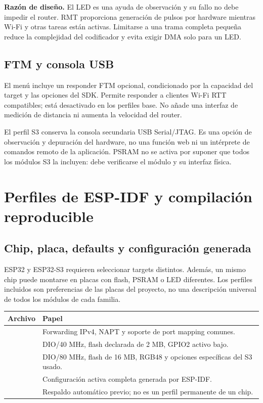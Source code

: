 \documentclass[11pt,a4paper]{article}
\newcommand{\decision}[1]{\par\textbf{Razón de diseño.} #1\par}
\begin{document}
\decision{El LED es una ayuda de observación y su fallo no debe impedir
el router. RMT proporciona generación de pulsos por hardware mientras
Wi-Fi y otras tareas están activas. Limitarse a una trama completa pequeña
reduce la complejidad del codificador y evita exigir DMA solo para un LED.}

\subsection{FTM y consola USB}

El menú incluye un responder FTM opcional, condicionado por la capacidad
del target y las opciones del SDK. Permite responder a clientes Wi-Fi RTT
compatibles; está desactivado en los perfiles base. No añade una interfaz
de medición de distancia ni aumenta la velocidad del router.

El perfil S3 conserva la consola secundaria USB Serial/JTAG. Es una
opción de observación y depuración del hardware, no una función web ni
un intérprete de comandos remoto de la aplicación. PSRAM no se activa
por suponer que todos los módulos S3 la incluyen: debe verificarse el
módulo y su interfaz física.

\section{Perfiles de ESP-IDF y compilación reproducible}
\label{sec:configuracion}

\subsection{Chip, placa, defaults y configuración generada}

ESP32 y ESP32-S3 requieren seleccionar targets distintos. Además, un
mismo chip puede montarse en placas con flash, PSRAM o LED diferentes.
Los perfiles incluidos son preferencias de las placas del proyecto,
no una descripción universal de todos los módulos de cada familia.

\begin{tabularx}{\textwidth}{@{}p{5.4cm}Y@{}}
\toprule
Archivo & Papel \\
\midrule
{} & Forwarding IPv4, NAPT y soporte de port mapping comunes. \\
 & DIO/40 MHz, flash declarada de 2 MB, GPIO2 activo bajo. \\
 & DIO/80 MHz, flash de 16 MB, RGB48 y opciones específicas del S3 usado. \\
 & Configuración activa completa generada por ESP-IDF. \\
 & Respaldo automático previo; no es un perfil permanente de un chip. \\
\bottomrule
\end{tabularx}
\end{document}
